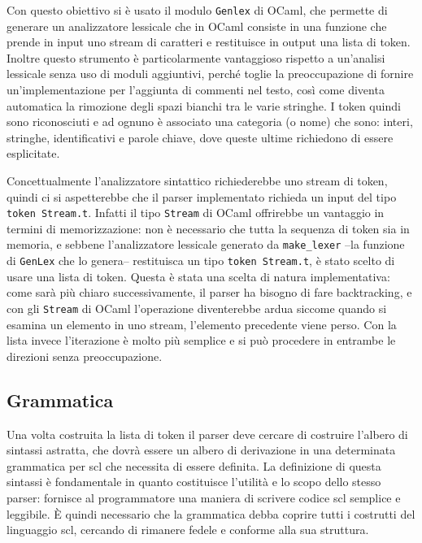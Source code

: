 \documentclass[]{article}
\begin{document}
Con questo obiettivo si è usato il modulo \texttt{Genlex} di OCaml, che
permette di generare un analizzatore lessicale che in OCaml consiste in
una funzione che prende in input uno stream di caratteri e restituisce
in output una lista di token. Inoltre questo strumento è particolarmente
vantaggioso rispetto a un'analisi lessicale senza uso di moduli
aggiuntivi, perché toglie la preoccupazione di fornire
un'implementazione per l'aggiunta di commenti nel testo, così come
diventa automatica la rimozione degli spazi bianchi tra le varie
stringhe. I token quindi sono riconosciuti e ad ognuno è associato una
categoria (o nome) che sono: interi, stringhe, identificativi e parole
chiave, dove queste ultime richiedono di essere esplicitate.

Concettualmente l'analizzatore sintattico richiederebbe uno stream di
token, quindi ci si aspetterebbe che il parser implementato richieda un
input del tipo \texttt{token\ Stream.t}. Infatti il tipo \texttt{Stream}
di OCaml offrirebbe un vantaggio in termini di memorizzazione: non è
necessario che tutta la sequenza di token sia in memoria, e sebbene
l'analizzatore lessicale generato da \texttt{make\_lexer} --la funzione
di \texttt{GenLex} che lo genera-- restituisca un tipo
\texttt{token\ Stream.t}, è stato scelto di usare una lista di token.
Questa è stata una scelta di natura implementativa: come sarà più chiaro
successivamente, il parser ha bisogno di fare backtracking, e con gli
\texttt{Stream} di OCaml l'operazione diventerebbe ardua siccome quando
si esamina un elemento in uno stream, l'elemento precedente viene perso.
Con la lista invece l'iterazione è molto più semplice e si può procedere
in entrambe le direzioni senza preoccupazione.

\hypertarget{grammatica}{%
\subsection{Grammatica}\label{grammatica}}

Una volta costruita la lista di token il parser deve cercare di
costruire l'albero di sintassi astratta, che dovrà essere un albero di
derivazione in una determinata grammatica per scl che necessita di
essere definita. La definizione di questa sintassi è fondamentale in
quanto costituisce l'utilità e lo scopo dello stesso parser: fornisce al
programmatore una maniera di scrivere codice scl semplice e leggibile. È
quindi necessario che la grammatica debba coprire tutti i costrutti del
linguaggio scl, cercando di rimanere fedele e conforme alla sua
struttura.
\end{document}
